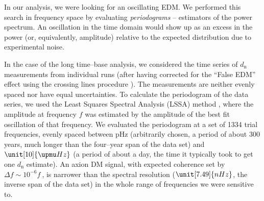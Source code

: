 In our analysis, we were looking for an oscillating EDM. We performed this search in frequency space by evaluating \emph{periodograms} -- estimators of the power spectrum. An oscillation in the time domain would show up as an excess in the power (or, equivalently, amplitude) relative to the expected distribution due to experimental noise.

In the case of the long time--base analysis, we considered the time series of $d_\mathrm{n}$ measurements from individual runs (after having corrected for the ``False EDM'' effect \cite{Pendlebury2004} using the crossing lines procedure \cite{Pendlebury2015}). %
The measurements are neither evenly spaced nor have equal uncertainties.
To calculate the periodogram of the data series, we used the Least Squares Spectral Analysis (LSSA) method \cite{Scargle1982,Cumming2004}, where the amplitude at frequency $f$ was estimated by the amplitude of the best fit oscillation of that frequency. We evaluated the periodogram at a set of 1334 trial frequencies, evenly spaced between \unit[100]{pHz} (arbitrarily chosen, a period of about 300 years, much longer than the four--year span of the data set) and $\unit[10]{\upmu Hz}$ (a period of about a day, the time it typically took to get one $d_\mathrm{n}$ estimate).
An axion DM signal, with expected coherence set by $\Delta f \sim 10^{-6} f~$\footnotemark[1],
is narrower than the spectral resolution ($\unit[7.49]{nHz}$, the inverse span of the data set) in the whole range of frequencies we were sensitive to.
